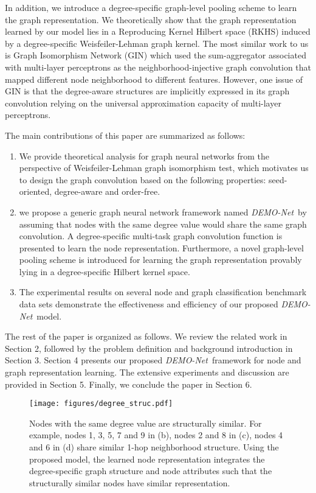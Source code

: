 \documentclass[sigconf]{acmart}
\newcommand{\demonet}{{\emph {DEMO-Net}}}
\begin{document}
In addition, we introduce a degree-specific graph-level pooling scheme to learn the graph representation. We theoretically show that the graph representation learned by our model lies in a Reproducing Kernel Hilbert space (RKHS) induced by a degree-specific Weisfeiler-Lehman graph kernel. The most similar work to us is Graph Isomorphism Network (GIN) \cite{xu2018powerful} which used the sum-aggregator associated with multi-layer perceptrons as the neighborhood-injective graph convolution that mapped different node neighborhood to different features. However, one issue of GIN is that 
the degree-aware structures are implicitly expressed in its graph convolution relying on the universal approximation capacity of multi-layer perceptrons.

The main contributions of this paper are summarized as follows:
\begin{enumerate}
    \item We provide theoretical analysis for graph neural networks from the perspective of Weisfeiler-Lehman graph isomorphism test, which motivates us to design the graph convolution based on the following properties: seed-oriented, degree-aware and order-free.
    
    \item we propose a generic graph neural network framework named \demonet\ by assuming that nodes with the same degree value would share the same graph convolution. A degree-specific multi-task graph convolution function is presented to learn the node representation. Furthermore, a novel graph-level pooling scheme is introduced for learning the graph representation provably lying in a degree-specific Hilbert kernel space. 
    
    \item The experimental results on several node and graph classification benchmark data sets demonstrate the effectiveness and efficiency of our proposed \demonet\ model.
\end{enumerate}

The rest of the paper is organized as follows. We review the related work in Section 2, followed by the problem definition and background introduction in Section 3. Section 4 presents our proposed \demonet\ framework for node and graph representation learning. The extensive experiments and discussion are provided in Section 5. Finally, we conclude the paper in Section 6.

\begin{figure}[t]
\texttt{[image: figures/degree\_struc.pdf]}
\caption{Nodes with the same degree value are structurally similar. For example, nodes 1, 3, 5, 7 and 9 in (b), nodes 2 and 8 in (c), nodes 4 and 6 in (d) share similar 1-hop neighborhood structure. Using the proposed model, the learned node representation integrates the degree-specific graph structure and node attributes such that the structurally similar nodes have similar representation.}
\label{degree_struc}
\vspace{-3mm}
\end{figure}
\end{document}
